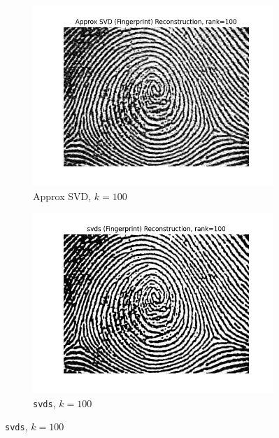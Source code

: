 \documentclass[11pt,a4paper, margin=1in]{article}
\begin{document}
\begin{enumerate}
\begin{figure}[H]
      \vspace{0.5em} %
    
      \begin{subfigure}[b]{0.35\textwidth}
          \centering
          \includegraphics[width=\textwidth]{Approx SVD (Fingerprint)_reconstruction_rank_100.png}
          \caption{Approx SVD, $k=100$}
      \end{subfigure}
      \hfill
      \begin{subfigure}[b]{0.35\textwidth}
          \centering
          \includegraphics[width=\textwidth]{svds (Fingerprint)_reconstruction_rank_100.png}
          \caption{\texttt{svds}, $k=100$}
      \end{subfigure}


\end{figure}
\end{enumerate}
\end{document}

